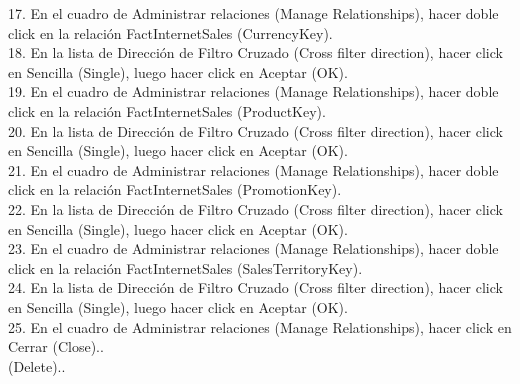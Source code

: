 \begin{flushleft}
\begin{itemize}
17. En el cuadro de Administrar relaciones (Manage Relationships), hacer doble click en la relación
FactInternetSales (CurrencyKey).\\
18. En la lista de Dirección de Filtro Cruzado (Cross filter direction), hacer click en Sencilla (Single), luego
hacer click en Aceptar (OK).\\
19. En el cuadro de Administrar relaciones (Manage Relationships), hacer doble click en la relación
FactInternetSales (ProductKey).\\
20. En la lista de Dirección de Filtro Cruzado (Cross filter direction), hacer click en Sencilla (Single), luego
hacer click en Aceptar (OK).\\
21. En el cuadro de Administrar relaciones (Manage Relationships), hacer doble click en la relación
FactInternetSales (PromotionKey).\\
22. En la lista de Dirección de Filtro Cruzado (Cross filter direction), hacer click en Sencilla (Single), luego
hacer click en Aceptar (OK).\\
23. En el cuadro de Administrar relaciones (Manage Relationships), hacer doble click en la relación
FactInternetSales (SalesTerritoryKey).\\
24. En la lista de Dirección de Filtro Cruzado (Cross filter direction), hacer click en Sencilla (Single), luego
hacer click en Aceptar (OK).\\
25. En el cuadro de Administrar relaciones (Manage Relationships), hacer click en Cerrar (Close)..\\
(Delete)..\\


\end{itemize}
\end{flushleft}
